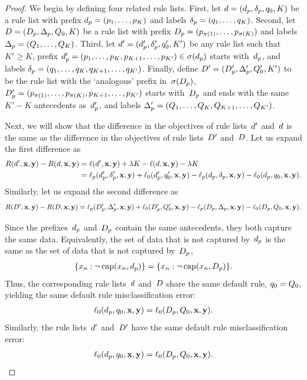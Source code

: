 \begin{proof}
We begin by defining four related rule lists.
%
First, let ${{d} = (d_p, \delta_p, q_0, K)}$
be a rule list with prefix ${d_p = (p_1, \dots, p_K)}$
and labels ${\delta_p = (q_1, \dots, q_K)}$.
%
Second, let ${{D} = (D_p, \Delta_p, Q_0, K)}$
be a rule list with prefix
${D_p = (p_{\pi(1)}, \dots, p_{\pi(K)})}$
and labels  ${\Delta_p = (Q_1, \dots, Q_K)}$.
%
Third, let ${{d}' = (d_p', \delta_p', q_0', K')}$
be any rule list such that~${K' \ge K}$, prefix
${d_p' = (p_1, \dots, p_K, p_{K+1}, \dots, p_{K'}) \in \sigma(d_p)}$
starts with~$d_p$, and labels
${\delta_p = (q_1, \dots, q_K, q_{K+1}, \dots, q_{K'})}$.
%
Finally, define ${{D}' = (D_p', \Delta_p', Q_0', K')}$
to be the rule list with the `analogous' prefix in~$\sigma(D_p)$,
\ie ${D_p' = (p_{\pi(1)}, \dots, p_{\pi(K)}, p_{K+1}, \dots, p_{K'})}$
starts with~$D_p$ and ends with the same~${K'-K}$
antecedents as~$d_p'$, and labels
${\Delta_p' = (Q_1, \dots, Q_K, Q_{K+1}, \dots, Q_{K'})}$.

Next, we will show that the difference in the objectives
of rule lists~${d}'$ and~${d}$ is the same as the difference
in the objectives of rule lists~${D}'$ and~${D}$.
%
Let us expand the first difference as
\begin{align}
\Obj(\RL', \x, \y) - \Obj(\RL, \x, \y)
&= \Loss(\RL', \x, \y) + \Reg K - \Loss(\RL, \x, \y) - \Reg K \nn \\
&= \Loss_p(\Prefix', \Labels', \x, \y) + \Loss_0(\Prefix', \Default', \x, \y)
  - \Loss_p(\Prefix, \Labels, \x, \y) - \Loss_0(\Prefix, \Default, \x, \y) \nn.
\end{align}
Similarly, let us expand the second difference as
\begin{align}
\Obj(\RLB', \x, \y) - \Obj(\RLB, \x, \y)
= \Loss_p(\PrefixB', \LabelsB', \x, \y) + \Loss_0(\PrefixB', \DefaultB', \x, \y)
  - \Loss_p(\PrefixB, \LabelsB, \x, \y) - \Loss_0(\PrefixB, \DefaultB, \x, \y) \nn.
\end{align}

Since the prefixes~$d_p$ and~$D_p$ contain
the same antecedents, they both capture the same data.
%
Equivalently, the set of data that is not captured by~$d_p$
is the same as the set of data that is not captured by~$D_p$, \ie
\begin{align}
\{x_n : \neg\, \Cap(x_n, \Prefix)\} = \{x_n : \neg\, \Cap(x_n, \PrefixB)\}.
\end{align}
Thus, the corresponding rule lists~${d}$ and~${D}$
share the same default rule, \ie ${q_0 = Q_0}$,
yielding the same default rule misclassification error:
\begin{align}
\Loss_0(\Prefix, \Default, \x, \y) = \Loss_0(\PrefixB, \DefaultB, \x, \y).
\end{align}
Similarly, the rule lists~${d}'$ and~${D}'$ have the same
default rule misclassification error:
\begin{align}
\Loss_0(\Prefix, \Default, \x, \y) = \Loss_0(\PrefixB, \DefaultB, \x, \y).
\end{align}


\end{proof}
